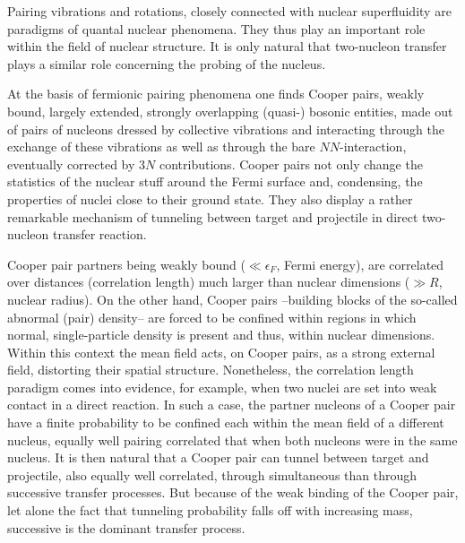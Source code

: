 Pairing vibrations and rotations, closely connected with nuclear superfluidity are  paradigms of quantal nuclear phenomena. They thus play an important  role within the field of nuclear structure. It is only natural that two-nucleon transfer plays a similar role concerning the probing of the nucleus.

 
At the basis of fermionic pairing phenomena one finds Cooper pairs, weakly bound, largely extended, strongly overlapping (quasi-) bosonic entities, made out of pairs of nucleons dressed by collective vibrations and interacting through the exchange of these vibrations as well as through the bare $NN$-interaction, eventually corrected by $3N$ contributions.
Cooper pairs not only change the statistics of the nuclear stuff around the Fermi surface and, condensing, the properties of nuclei close to their ground state. They also display a rather remarkable mechanism of tunneling between  target and projectile in  direct two-nucleon transfer reaction.


Cooper pair partners being weakly bound ($\ll \epsilon_F$, Fermi energy), are correlated over distances (correlation length) much larger than nuclear dimensions ($\gg R$, nuclear radius). On the other hand, Cooper pairs --building blocks of the so-called abnormal (pair) density-- are forced to be confined within regions in which normal, single-particle density is present and thus, within nuclear dimensions. Within this context the mean field acts, on Cooper pairs, as a strong external field,  distorting their spatial structure.
Nonetheless,  the correlation length paradigm comes into evidence, for example, when two nuclei are set into weak contact in a direct reaction. In such a  case,  the partner nucleons of a Cooper pair have a finite probability to be confined each within the mean field of a different nucleus, equally well pairing correlated that when both nucleons were in the same nucleus. It is then natural that a Cooper pair can tunnel between target and projectile, also equally well correlated, through simultaneous than through successive transfer processes. But because of the weak binding of the Cooper pair, let alone the fact that tunneling probability falls off with increasing mass, successive is the dominant transfer process.
 
